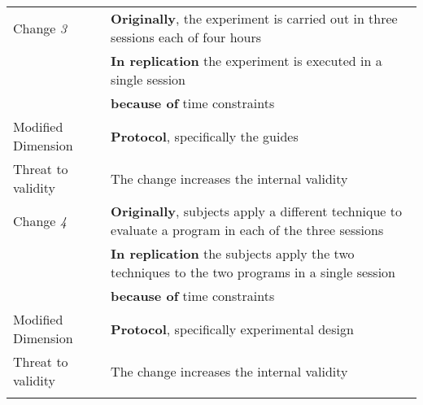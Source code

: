 \begin{table*}[h]
\begin{tabularx}{\textwidth}{
  >{\hsize=0.3\hsize}X
  >{\hsize=0.8\hsize}X}
    Change \textit{3}   & \textbf{Originally}, the experiment is carried out in three sessions each of four hours \\& \textbf{In replication} the experiment is executed in a single session \\& \textbf{because of} time constraints \\  

    Modified Dimension & 
    \textbf{Protocol}, specifically the guides \\  
    Threat to validity  & The change increases the internal validity \\   \hline

    Change \textit{4}   & \textbf{Originally}, subjects apply a different technique to  evaluate a program in each of the three sessions \\& \textbf{In replication} the subjects apply the two techniques to the two programs in a single session 
    \\& \textbf{because of} time constraints \\  
 
    Modified Dimension & 
    \textbf{Protocol}, specifically experimental design \\   
    Threat to validity  & The change increases the internal validity \\  
	\noalign{\smallskip\smallskip}\hline
	\end{tabularx}  
\end{table*}
